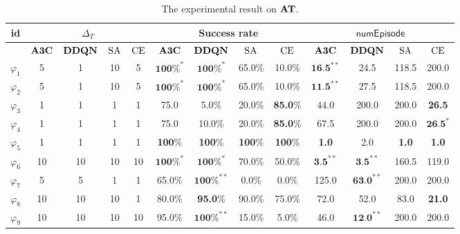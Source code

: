 \begin{table}[tp]
  \centering
    \centering
    \scriptsize
    \begin{tabular}[t]{c||c c c c|c c c c|c c c c|}
      id & \multicolumn{4}{|c|}{$\Delta_T$} & \multicolumn{4}{|c|}{Success rate} & \multicolumn{4}{|c|}{$\mathsf{numEpisode}$}\\
      \hline
      & $\mathbf{A3C}$ & $\mathbf{DDQN}$ & $\mathrm{SA}$ & $\mathrm{CE}$ & $\mathbf{A3C}$ & $\mathbf{DDQN}$ & $\mathrm{SA}$ & $\mathrm{CE}$ & $\mathbf{A3C}$ & $\mathbf{DDQN}$ & $\mathrm{SA}$ & $\mathrm{CE}$ \\
      \hline
      \hline
      $\varphi_1$ & 5 & 1 & 10 & 5 & $\textbf{100}\%^*$ & $\textbf{100}\%^*$ & 65.0\% & 10.0\% & $\textbf{16.5}^{**}$ & 24.5 & 118.5 & 200.0\\
      $\varphi_2$ & 5 & 1 & 10 & 5 & $\textbf{100}\%^*$ & $\textbf{100}\%^*$ & 65.0\% & 10.0\% & $\textbf{11.5}^{**}$ & 27.5 & 118.5 & 200.0\\
      $\varphi_3$ & 1 & 1 & 1 & 1 & 75.0 & 5.0\% & 20.0\% & \textbf{85.0}\% & 44.0 & 200.0 & 200.0 & \textbf{26.5}\\
      $\varphi_4$ & 1 & 1 & 1 & 1 & 75.0 & 10.0\% & 20.0\% & \textbf{85.0}\% & 67.5 & 200.0 & 200.0 & $\textbf{26.5}^{*}$\\
      $\varphi_5$ & 1 & 1 & 1 & 1 & \textbf{100}\% & \textbf{100}\% & \textbf{100}\% & \textbf{100}\% & \textbf{1.0} & 2.0 & \textbf{1.0} & \textbf{1.0} \\
      $\varphi_6$ & 10 & 10 & 10 & 10 & $\textbf{100}\%^*$ & $\textbf{100}\%^*$ & 70.0\% & 50.0\% & $\textbf{3.5}^{**}$ & $\textbf{3.5}^{**}$ & 160.5 & 119.0\\
      $\varphi_7$ & 5 & 5 & 1 & 1 & 65.0\% & $\textbf{100}\%^{**}$ & 0.0\% & 0.0\% & 125.0 & $\textbf{63.0}^{**}$ & 200.0 & 200.0\\
      $\varphi_8$ & 10 & 10 & 10 & 1 & 80.0\% & \textbf{95.0}\% & 90.0\% & 75.0\% & 72.0 & 52.0 & 83.0 & \textbf{21.0}\\
      $\varphi_9$ & 10 & 10 & 10 & 10 & 95.0\% & $\textbf{100}\%^{**}$ & 15.0\% & 5.0\% & 46.0 & $\textbf{12.0}^{**}$ & 200.0 & 200.0 \\
      \hline
  \end{tabular}
  \caption{The experimental result on $\mathbf{AT}$.}
  \label{tab:ARCH2014}
   \vspace{-5mm}
\end{table}



